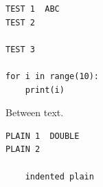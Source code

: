 \documentclass[12pt]{book}
\begin{document}
\begin{Verbatim}
TEST 1  ABC
TEST 2

TEST 3

for i in range(10):
    print(i)
\end{Verbatim}

Between text.

\begin{verbatim}
PLAIN 1  DOUBLE
PLAIN 2

    indented plain
\end{verbatim}
\end{document}
